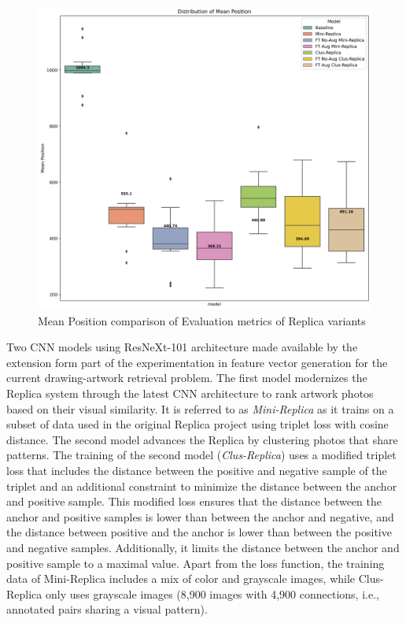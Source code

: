 \begin{figure}[ht]
    \centering
    \includegraphics[width=\textwidth]{images/metrics/mp_replica_500dpi.png}
      \caption{Mean Position comparison of Evaluation metrics of Replica variants}
      \label{fig:replica-ft-mp}
\end{figure}

Two CNN models using ResNeXt-101 architecture made available by the extension form part of the experimentation in feature vector generation for the current drawing-artwork retrieval problem. The first model modernizes the Replica system through the latest CNN architecture to rank artwork photos based on their visual similarity. It is referred to as \textit{Mini-Replica} as it trains on a subset of data used in the original Replica project using triplet loss with cosine distance. The second model advances the Replica by clustering photos that share patterns. The training of the second model (\textit{Clus-Replica}) uses a modified triplet loss that includes the distance between the positive and negative sample of the triplet and an additional constraint to minimize the distance between the anchor and positive sample. This modified loss ensures that the distance between the anchor and positive samples is lower than between the anchor and negative, and the distance between positive and the anchor is lower than between the positive and negative samples. Additionally, it limits the distance between the anchor and positive sample to a maximal value. Apart from the loss function, the training data of Mini-Replica includes a mix of color and grayscale images, while Clus-Replica only uses grayscale images (8,900 images with 4,900 connections, i.e., annotated pairs sharing a visual pattern).

